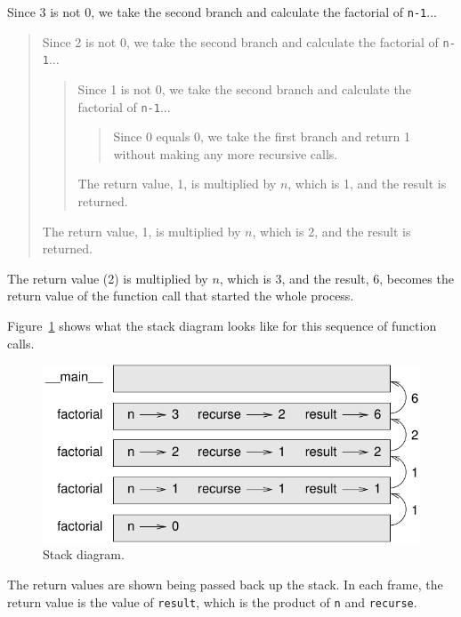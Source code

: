 \documentclass[10pt]{book}
\begin{document}
Since 3 is not 0, we take the second branch and calculate the factorial
of {\tt n-1}...

\begin{quote}
Since 2 is not 0, we take the second branch and calculate the factorial of
{\tt n-1}...


  \begin{quote}
  Since 1 is not 0, we take the second branch and calculate the factorial
  of {\tt n-1}...


    \begin{quote}
    Since 0 equals 0, we take the first branch and return 1
    without making any more recursive calls.
    \end{quote}


  The return value, 1, is multiplied by $n$, which is 1, and the
  result is returned.
  \end{quote}


The return value, 1, is multiplied by $n$, which is 2, and the
result is returned.
\end{quote}


The return value (2) is multiplied by $n$, which is 3, and the result, 6,
becomes the return value of the function call that started the whole
process.

Figure~\ref{fig.stack3} shows what the stack diagram looks like for
this sequence of function calls.

\begin{figure}
\centerline
{\includegraphics[scale=0.8]{figs/stack3.pdf}}
\caption{Stack diagram.}
\label{fig.stack3}
\end{figure}

The return values are shown being passed back up the stack.  In each
frame, the return value is the value of {\tt result}, which is the
product of {\tt n} and {\tt recurse}.
\end{document}
